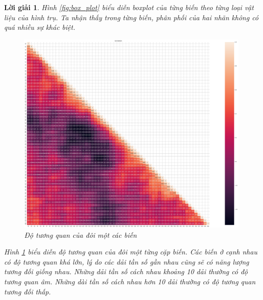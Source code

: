 \documentclass[14pt, a4paper]{article}
\theoremstyle{sltheorem}
\theoremstyle{soltheorem}
\newtheorem*{loigiai}{Lời giải}
\begin{document}
\begin{loigiai}
    Hình \ref{fig:box_plot} biểu diễn boxplot của từng biến theo từng loại vật liệu của hình trụ.
    Ta nhận thấy trong từng biến, phân phối của hai nhãn không có quá nhiều sự khác biệt.

    \begin{figure}[h!]
        \centering
        \includegraphics[scale=0.2]{correl_heatmap.png}
        \caption{Độ tương quan của đôi một các biến}
        \label{fig:correl_heatmap}
    \end{figure}

    Hình \ref{fig:correl_heatmap} biểu diễn độ tương quan của đôi một từng cặp biến.
    Các biến ở cạnh nhau có độ tương quan khá lớn, lý do các dải tần số gần nhau cũng sẽ có năng lượng tương đối giống nhau.
    Những dải tần số cách nhau khoảng 10 dải thường có độ tương quan âm.
    Những dài tần số cách nhau hơn 10 dải thường có độ tương quan tương đối thấp.


\end{loigiai}
\end{document}

